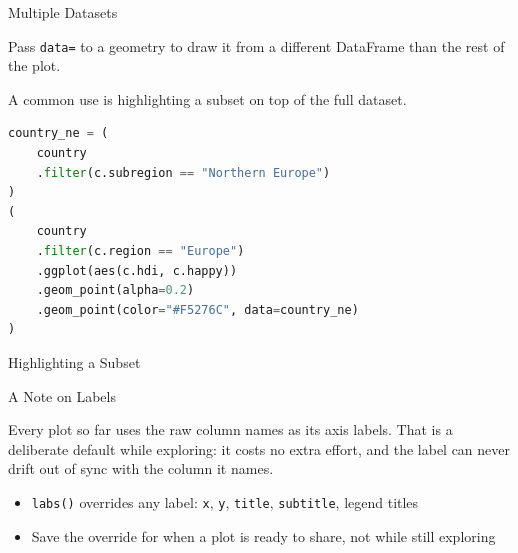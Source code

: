 \documentclass[8pt,aspectratio=169]{beamer}
\begin{document}
\begin{frame}[fragile]{Multiple Datasets}
\begin{splitcode}{%

Pass \texttt{data=} to a geometry to draw it from a different DataFrame than the rest of the plot.

A common use is highlighting a subset on top of the full dataset.

}
\begin{lstlisting}[language=Python]
country_ne = (
    country
    .filter(c.subregion == "Northern Europe")
)
(
    country
    .filter(c.region == "Europe")
    .ggplot(aes(c.hdi, c.happy))
    .geom_point(alpha=0.2)
    .geom_point(color="#F5276C", data=country_ne)
)
\end{lstlisting}
\end{splitcode}
\end{frame}

\begin{rightframe}{Highlighting a Subset}
\end{rightframe}

\begin{textframe}{A Note on Labels}

Every plot so far uses the raw column names as its axis labels. That is a deliberate default while exploring: it costs no extra effort, and the label can never drift out of sync with the column it names.

\begin{itemize}
\item \texttt{labs()} overrides any label: \texttt{x}, \texttt{y}, \texttt{title}, \texttt{subtitle}, legend titles
\item Save the override for when a plot is ready to share, not while still exploring
\end{itemize}

\end{textframe}
\end{document}

